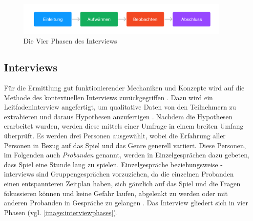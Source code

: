 
\begin{figure}
    \begin{center}
        \includegraphics[width=400px]{0.bilder/interviewphases.png}
    \end{center}
    \caption{Die Vier Phasen des Interviews} \label{image:interviewphases}
\end{figure}
\subsection{Interviews}
Für die Ermittlung gut funktionierender Mechaniken und Konzepte wird auf die Methode des kontextuellen Interviews zurückgegriffen \cite*[]{holtzblatt_beyer_1997}. Dazu wird ein Leitfadeninterview angefertigt, um qualitative Daten von den Teilnehmern zu extrahieren und daraus Hypothesen anzufertigen \cite*[]{baur_blasius}. Nachdem die Hypothesen erarbeitet wurden, werden diese mittels einer Umfrage in einem breiten Umfang überprüft. Es werden drei Personen ausgewählt, wobei die Erfahrung aller Personen in Bezug auf das Spiel und das Genre generell variiert. Diese Personen, im Folgenden auch \textit{Probanden} genannt, werden in Einzelgesprächen dazu gebeten, dass Spiel eine Stunde lang zu spielen. Einzelgespräche beziehungsweise -interviews sind Gruppengesprächen vorzuziehen, da die einzelnen Probanden einen entspannteren Zeitplan haben, sich gänzlich auf das Spiel und die Fragen fokussieren können und keine Gefahr laufen, abgelenkt zu werden oder mit anderen Probanden in Gespräche zu gelangen \cite*[]{lankoski_bjork}. Das Interview gliedert sich in vier Phasen (vgl. \autoref{image:interviewphases}).

